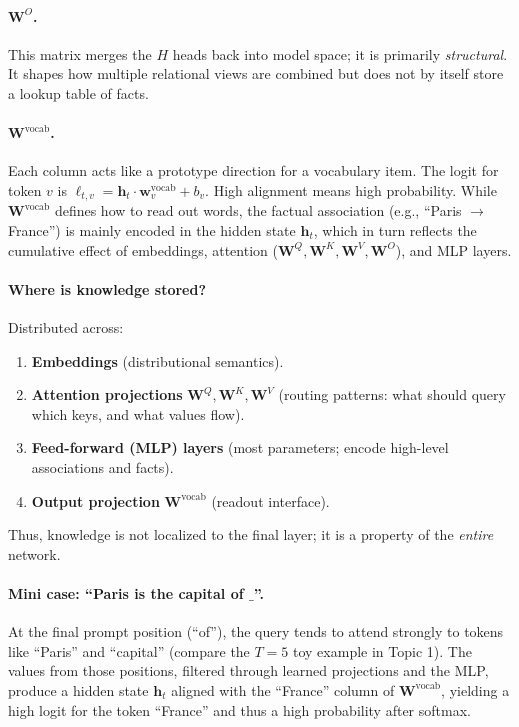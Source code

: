 \documentclass[11pt]{article}
\theoremstyle{remark}
\begin{document}
\paragraph{\(\mathbf{W}^O\).} This matrix merges the \(H\) heads back into model space; it is primarily \emph{structural}. It shapes how multiple relational views are combined but does not by itself store a lookup table of facts.

\paragraph{\(\mathbf{W}^{\text{vocab}}\).} Each column acts like a prototype direction for a vocabulary item. The logit for token \(v\) is \(\ell_{t,v}=\mathbf{h}_t\cdot \mathbf{w}^{\text{vocab}}_v+b_v\). High alignment means high probability. While \(\mathbf{W}^{\text{vocab}}\) defines how to read out words, the factual association (e.g., ``Paris \(\to\) France'') is mainly encoded in the hidden state \(\mathbf{h}_t\), which in turn reflects the cumulative effect of embeddings, attention (\(\mathbf{W}^Q,\mathbf{W}^K,\mathbf{W}^V,\mathbf{W}^O\)), and MLP layers.

\paragraph{Where is knowledge stored?} Distributed across:
\begin{enumerate}[noitemsep]
  \item \textbf{Embeddings} (distributional semantics).
  \item \textbf{Attention projections} \(\mathbf{W}^Q,\mathbf{W}^K,\mathbf{W}^V\) (routing patterns: what should query which keys, and what values flow).
  \item \textbf{Feed-forward (MLP) layers} (most parameters; encode high-level associations and facts).
  \item \textbf{Output projection} \(\mathbf{W}^{\text{vocab}}\) (readout interface).
\end{enumerate}
Thus, knowledge is not localized to the final layer; it is a property of the \emph{entire} network.

\paragraph{Mini case: ``Paris is the capital of \(\_\)''.}
At the final prompt position (``of''), the query tends to attend strongly to tokens like ``Paris'' and ``capital'' (compare the \(T=5\) toy example in Topic 1). The values from those positions, filtered through learned projections and the MLP, produce a hidden state \(\mathbf{h}_t\) aligned with the ``France'' column of \(\mathbf{W}^{\text{vocab}}\), yielding a high logit for the token ``France'' and thus a high probability after softmax.
\end{document}

